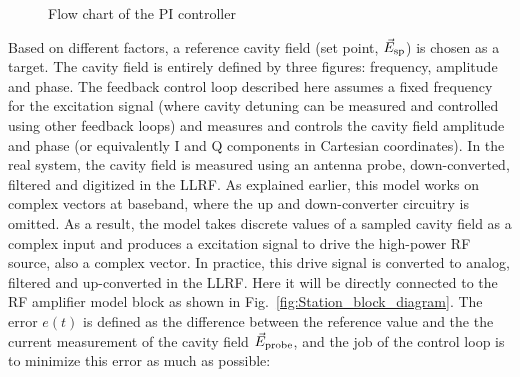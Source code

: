\documentclass[a4paper,12pt]{article}
\begin{document}
\begin{figure}[H]
\centering

\caption{Flow chart of the PI controller}
\label{fig:fpga_flow_chart}
\end{figure}

Based on different factors, a reference cavity field (set point, $\vec{E}_{\rm sp}$) is chosen as a target. The cavity field is entirely defined by three figures: frequency, amplitude and phase. The feedback control loop described here assumes a fixed frequency for the excitation signal (where cavity detuning can be measured and controlled using other feedback loops) and measures and controls the cavity field amplitude and phase (or equivalently I and Q components in Cartesian coordinates). In the real system, the cavity field is measured using an antenna probe, down-converted, filtered and digitized in the LLRF. As explained earlier, this model works on complex vectors at baseband, where the up and down-converter circuitry is omitted. As a result, the model takes discrete values of a sampled cavity field as a complex input and produces a excitation signal to drive the high-power RF source, also a complex vector. In practice, this drive signal is converted to analog, filtered and up-converted in the LLRF. Here it will be directly connected to the RF amplifier model block as shown in Fig.~\ref{fig:Station_block_diagram}. The error $e(t)$ is defined as the difference between the reference value and the the current measurement of the cavity field $\vec{E}_{\rm probe}$, and the job of the control loop is to minimize this error as much as possible:
\end{document}
